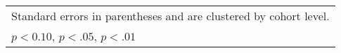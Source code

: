 \begin{table}[ht]
{\begin{tabular}{l*{5}{c}}
\hline\hline
\multicolumn{6}{l}{\footnotesize Standard errors in parentheses and are clustered by cohort level.}\\
\multicolumn{6}{l}{\footnotesize \sym{*} \(p<0.10\), \sym{**} \(p<.05\), \sym{***} \(p<.01\)}\\
\end{tabular}%
}
\end{table}